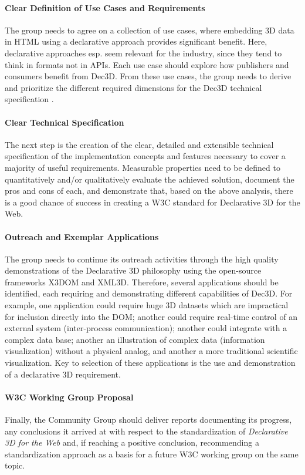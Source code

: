 \documentclass{acmsiggraph}
\begin{document}
\paragraph{Clear Definition of Use Cases and Requirements}
The group needs to agree on a collection of use cases, where embedding 3D data in HTML using a declarative approach provides significant benefit. Here, declarative approaches esp. seem relevant for the industry, since they tend to think in formats not in APIs.
Each use case should explore how publishers and consumers benefit from Dec3D. From these use cases, the group needs to derive and prioritize the different required dimensions for the Dec3D technical specification \cite{JankowskiDec3D2012,LeFeuvreDec3D2012}.

\paragraph{Clear Technical Specification}
The next step is the creation of the clear, detailed and extensible technical specification of the implementation concepts and features necessary to cover a majority of useful requirements. Measurable properties need to be defined to quantitatively and/or qualitatively evaluate the achieved solution, document the pros and cons of each, and demonstrate that, based on the above analysis, there is a good chance of success in creating a W3C standard for Declarative 3D for the Web.

\paragraph{Outreach and Exemplar Applications}
The group needs to continue its outreach activities through the high quality demonstrations of the Declarative 3D philosophy using the open-source frameworks X3DOM and XML3D. Therefore, several applications should be identified, each requiring and demonstrating different capabilities of Dec3D. For example, one application could require huge 3D datasets which are impractical for inclusion directly into the DOM; another could require real-time control of an external system (inter-process communication); another could integrate with a complex data base; another an illustration of complex data (information visualization) without a physical analog, and another a more traditional scientific visualization. Key to selection of these applications is the use and demonstration of a declarative 3D requirement.

\paragraph{W3C Working Group Proposal}
Finally, the Community Group should deliver reports documenting its progress, any conclusions it arrived at with respect to the standardization of \textit{Declarative 3D for the Web} and, if reaching a positive conclusion, recommending a standardization approach as a basis for a future W3C working group on the same topic.
\end{document}
